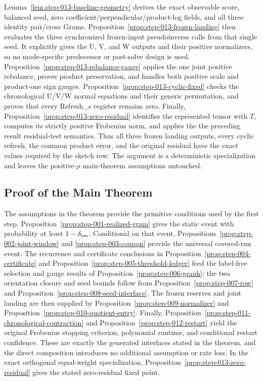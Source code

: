 Lemma~\ref{lem:step-013-baseline-geometry} derives the exact observable score,
balanced seed, zero coefficient/perpendicular/product-log fields, and all
three identity pair/cross Grams. Proposition~\ref{prop:step-013-frozen-landing}
then evaluates the three synchronized frozen-input pseudoinverse calls from
that single seed. It explicitly gives the U, V, and W outputs and their
positive normalizers, so no mode-specific predecessor or post-solve design is
used. Proposition~\ref{prop:step-013-rebalance-gauge} applies the one joint
positive rebalance, proves product preservation, and handles both positive
scale and product-one sign gauges. Proposition~\ref{prop:step-013-cyclic-fixed}
checks the chronological U/V/W normal equations and their generic permutation,
and proves that every Refresh\_s register remains zero. Finally,
Proposition~\ref{prop:step-013-zero-residual} identifies the represented tensor
with \(T\), computes its strictly positive Frobenius norm, and applies the
the preceding result residual-test semantics. Thus all three frozen landing
outputs, every cyclic refresh, the common product error, and the original
residual have the exact values required by the sketch row. The argument is a
deterministic specialization and leaves the positive-\(\rho\) main-theorem
assumptions untouched.

\subsection{Proof of the Main Theorem}\label{app:main-proof}
The assumptions in the theorem provide the primitive conditions used by the
first step.  Proposition~\ref{prop:step-001-realized-gram} gives the static event
with probability at least $1-\delta_{\rm sm}$.  Conditional on that event,
Propositions~\ref{prop:step-002-joint-window} and
\ref{prop:step-003-coupon} provide the universal covered-run event.  The
recurrence and certificate conclusions in Proposition~\ref{prop:step-004-certificate}
and Proposition~\ref{prop:step-005-threshold-ledger} feed the label-free selection
and gauge results of Proposition~\ref{prop:step-006-graph}; the two
orientation closure and seed bounds follow from Proposition~\ref{prop:step-007-row}
and Proposition~\ref{prop:step-008-seed-interface}.  The frozen reserves and
joint landing are then supplied by Proposition~\ref{prop:step-009-normalizer}
and Proposition~\ref{prop:step-010-quotient-entry}.  Finally,
Proposition~\ref{prop:step-011-chronological-contraction} and
Proposition~\ref{prop:step-012-restart} yield the original Frobenius stopping
criterion, polynomial runtime, and conditional restart confidence.  These are
exactly the generated interfaces stated in the theorem, and the direct
composition introduces no additional assumption or rate loss.  In the exact
orthogonal equal-weight specialization, Proposition~\ref{prop:step-013-zero-residual}
gives the stated zero-residual fixed point.

